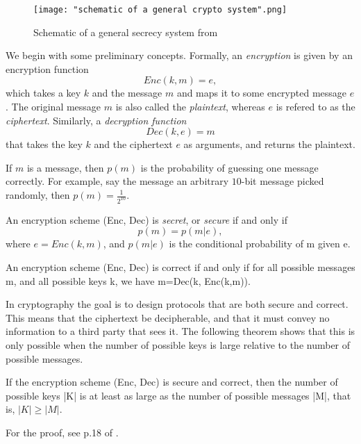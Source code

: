 \begin{figure}[h]
    \centering
    \texttt{[image: "schematic of a general crypto system".png]}
    \caption{Schematic of a general secrecy system from \cite{shannon1949communication}}
    \label{fig:general crypto schematic}
\end{figure}

\noindent
We begin with some preliminary concepts.  Formally, an {\emph{encryption}} is given by an encryption function 
$$Enc(k,m)=e ,$$
which takes a key $k$ and the message $m$ and maps it to some encrypted message $e$. The original message $m$ is also called the {\emph{plaintext}}, whereas $e$ is refered to as the {\emph{ciphertext}}. Similarly, a {\emph{decryption function}} $$Dec(k,e)=m$$
that takes the key $k$ and the ciphertext $e$ as arguments, and returns the plaintext. 

If $m$ is a message, then $p(m)$ is the probability of guessing one message correctly. For example, say the message an arbitrary $10$-bit message picked randomly, then $p(m)=\frac{1}{2^{10}}$.


\begin{definition} \label{def: shannon}
An encryption scheme (Enc, Dec) is \textit{secret}, or \textit{secure} if and only if 
\begin{equation}
    p(m)=p(m|e),
\end{equation}
where $e=Enc(k,m)$, and $p(m|e)$ is the conditional probability of m given e.

An encryption scheme (Enc, Dec) is correct if and only if for all possible messages m, and all possible keys k, we have m=Dec(k, Enc(k,m)).
\end{definition}
In cryptography the goal is to design protocols that are both secure and correct. This means that the ciphertext be decipherable, and that it must convey no information to a third party that sees it. The following theorem shows that this is only possible when the number of possible keys is large relative to the number of possible messages.
\begin{theorem}
If the encryption scheme (Enc, Dec) is secure and correct, then the number of possible keys |K| is at least as large as the number of possible messages |M|, that is, $|K| \ge |M|$.
\end{theorem}
For the proof, see p.18 of \cite{Wehner:notes}. 

